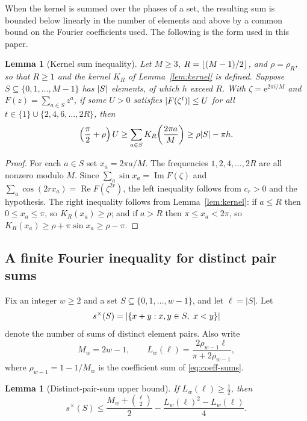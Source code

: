 \documentclass[11pt]{article}
\newtheorem{lemma}[theorem]{Lemma}
\theoremstyle{definition}
\theoremstyle{remark}
\numberwithin{equation}{section}
\DeclarePairedDelimiter{\set}{\{}{\}}
\DeclarePairedDelimiter{\abs}{\lvert}{\rvert}
\DeclarePairedDelimiter{\floor}{\lfloor}{\rfloor}
\newcommand{\e}{\mathrm{e}}
\begin{document}
When the kernel is summed over the phases of a set, the resulting sum is bounded below linearly in the number of elements and above by a common bound on the Fourier coefficients used. The following is the form used in this paper.

\begin{lemma}[Kernel sum inequality]\label{lem:kernel-sum}
Let $M\ge3$, $R=\floor{(M-1)/2}$, and $\rho=\rho_R$, so that $R\ge1$ and the kernel $K_R$ of Lemma~\ref{lem:kernel} is defined. Suppose $S\subseteq\{0,1,\ldots,M-1\}$ has $\abs S$ elements, of which $h$ exceed $R$. With $\zeta=\e^{2\pi i/M}$ and $F(z)=\sum_{a\in S}z^a$, if some $U>0$ satisfies $\abs{F(\zeta^t)}\le U$ for all $t\in\{1\}\cup\{2,4,6,\ldots,2R\}$, then
\begin{equation}\label{eq:finite-sum-lower}
  \left(\frac\pi2+\rho\right)U
  \ge
  \sum_{a\in S}K_R\!\left(\frac{2\pi a}{M}\right)
  \ge\rho\abs S-\pi h.
\end{equation}
\end{lemma}

\begin{proof}
For each $a\in S$ set $x_a=2\pi a/M$. The frequencies $1,2,4,\ldots,2R$ are all nonzero modulo $M$. Since $\sum_a\sin x_a=\operatorname{Im}F(\zeta)$ and $\sum_a\cos(2rx_a)=\operatorname{Re}F(\zeta^{2r})$, the left inequality follows from $c_r>0$ and the hypothesis. The right inequality follows from Lemma~\ref{lem:kernel}: if $a\le R$ then $0\le x_a\le\pi$, so $K_R(x_a)\ge\rho$; and if $a>R$ then $\pi\le x_a<2\pi$, so $K_R(x_a)\ge\rho+\pi\sin x_a\ge\rho-\pi$.
\end{proof}

\subsection{A finite Fourier inequality for distinct pair sums}

Fix an integer $w\ge2$ and a set $S\subseteq\{0,1,\ldots,w-1\}$, and let $\ell=|S|$. Let
\[
  s^{\times}(S)=
  \abs*{\set{x+y:x,y\in S,\ x<y}}
\]
denote the number of sums of distinct element pairs. Also write
\[
  M_w=2w-1,\qquad
  L_w(\ell)=\frac{2\rho_{w-1}\ell}{\pi+2\rho_{w-1}},
\]
where $\rho_{w-1}=1-1/M_w$ is the coefficient sum of \eqref{eq:coeff-sums}.

\begin{lemma}[Distinct-pair-sum upper bound]\label{lem:distinct-pair}
If $L_w(\ell)\ge\tfrac12$, then
\begin{equation}\label{eq:distinct-pair}
  s^{\times}(S)
  \le
  \frac{M_w+\binom{\ell}{2}}{2}
  -\frac{L_w(\ell)^2-L_w(\ell)}4.
\end{equation}
\end{lemma}
\end{document}
